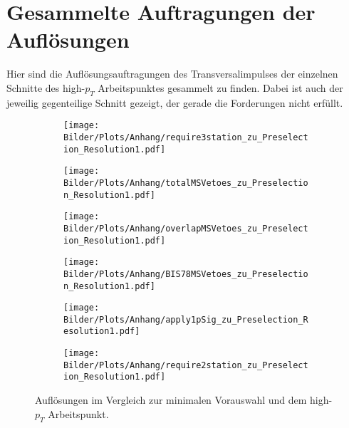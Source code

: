 \chapter{Gesammelte Auftragungen der Auflösungen}\label{AnhangAufl}
Hier sind die Auflösungsauftragungen des Transversalimpulses der einzelnen Schnitte des high-$p_T$ Arbeitspunktes gesammelt zu finden. Dabei ist auch der jeweilig gegenteilige Schnitt gezeigt, der gerade die Forderungen nicht erfüllt. 
\begin{figure}
  \begin{subfigure}[t]{0.5\textwidth}
  \texttt{[image: Bilder/Plots/Anhang/require3station\_zu\_Preselection\_Resolution1.pdf]}
  \end{subfigure}
\begin{subfigure}[t]{0.5\textwidth}
 \texttt{[image: Bilder/Plots/Anhang/totalMSVetoes\_zu\_Preselection\_Resolution1.pdf]}
\end{subfigure}
\begin{subfigure}[t]{0.5\textwidth}
  \texttt{[image: Bilder/Plots/Anhang/overlapMSVetoes\_zu\_Preselection\_Resolution1.pdf]}
\end{subfigure}
\begin{subfigure}[t]{0.5\textwidth}
  \texttt{[image: Bilder/Plots/Anhang/BIS78MSVetoes\_zu\_Preselection\_Resolution1.pdf]}
\end{subfigure}
\begin{subfigure}[t]{0.5\textwidth}
  \texttt{[image: Bilder/Plots/Anhang/apply1pSig\_zu\_Preselection\_Resolution1.pdf]}
\end{subfigure}
\begin{subfigure}[t]{0.5\textwidth}
  \texttt{[image: Bilder/Plots/Anhang/require2station\_zu\_Preselection\_Resolution1.pdf]}
\end{subfigure}
\caption{Auflösungen im Vergleich zur minimalen Vorauswahl und dem high-$p_T$ Arbeitspunkt.}
\end{figure}
